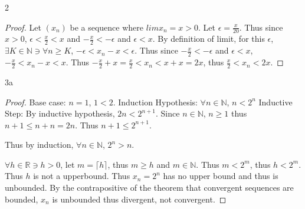 \documentclass{article}
\newcommand{\R}{\mathbb{R}}
\newcommand{\N}{\mathbb{N}}
\newcommand{\ceil}[1]{\lceil{#1}\rceil}
\begin{document}
\bigskip

\begin{PROB}{2}\label{Problem 2.}
    
\end{PROB}
\begin{proof}
    Let $(x_n)$ be a sequence where $lim x_n = x > 0$.   
    Let $\epsilon = \frac{x}{20}$. Thus since $x > 0$, $\epsilon < \frac{x}{2} < x$ and $-\frac{x}{2} < -\epsilon$ and $\epsilon < x$. By definition of limit, for this $\epsilon$, $\exists K \in \N \ni \forall n \geq K$, $-\epsilon < x_n - x < \epsilon$. Thus since $-\frac{x}{2} < -\epsilon$ and $\epsilon < x$, $-\frac{x}{2} < x_n - x < x$. Thus $-\frac{x}{2} + x = \frac{x}{2} < x_n < x + x =2x$, thus $\frac{x}{2} < x_n < 2x$.            
\end{proof}

\bigskip

\begin{PROB}{3a}\label{Problem 3a.}
\end{PROB}
\begin{proof}
    Base case: $n = 1$, $1 < 2$. 
    Induction Hypothesis: $\forall n \in \N$, $n < 2^n$
    Inductive Step: By inductive hypothesis, $2n < 2^{n + 1}$. Since $n \in \N$, $n \geq 1$ thus $n + 1 \leq n + n = 2n$. Thus $n + 1 \leq 2^{n + 1}$. 
    
    Thus by induction, $\forall n \in \N$, $2^n > n$.    

    $\forall h \in \R \ni h > 0$, let $m = \ceil h$, thus $m \geq h$ and $m \in \N$. Thus $m < 2^m$, thus $h < 2^m$. Thus $h$ is not a upperbound. Thus $x_n = 2^n$ has no upper bound and thus is unbounded. By the contrapositive of the theorem that convergent sequences are bounded, $x_n$ is unbounded thus divergent, not convergent.         
\end{proof}
\end{document}
